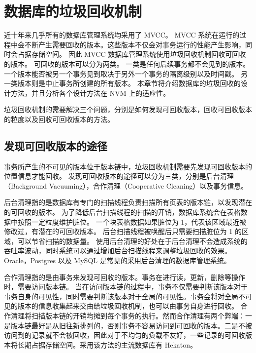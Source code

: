 \section{数据库的垃圾回收机制}

近十年来几乎所有的数据库管理系统均采用了 MVCC。
MVCC 系统在运行的过程中会不断产生需要回收的版本。这些版本不仅会对事务运行的性能产生影响，同时会占据存储空间。
因此 MVCC 数据库管理系统使用垃圾回收机制回收可回收的版本。
可回收的版本可以分为两类。
一类是任何后续事务都不会见到的版本。一个版本能否被另一个事务见到取决于另外一个事务的隔离级别以及时间戳。
另一类版本则是中止事务所创建的所有版本。
本章节将介绍数据库的垃圾回收的设计方法，并且分析各个设计方法在 NVM 上的适应性。

垃圾回收机制的需要解决三个问题，分别是如何发现可回收版本，回收可回收版本的粒度以及回收可回收版本的方法。

\subsection{发现可回收版本的途径}

事务所产生的不可见的版本位于版本链中，垃圾回收机制需要先发现可回收版本的位置信息才能回收。
发现可回收版本的途径可以分为三类，分别是后台清理（Background Vacuuming），合作清理（Cooperative Cleaning）以及事务信息。

后台清理指的是数据库有专门的扫描线程负责扫描所有页表的版本链，以发现潜在的可回收的版本。
为了降低后台扫描线程的扫描的开销，数据库系统会在表格数据中按照一定粒度维护脏位。
一个块表格数据如果脏位为 1，代表该区域最近被修改过，有潜在的可回收版本。
后台扫描线程被唤醒后只需要扫描脏位为 1 的区域，可以节省扫描的数据量。
使用后台清理的好处在于后台清理不会造成系统的吞吐率波动，同时系统可以通过增加后台扫描线程来调整垃圾回收的效果。Oracle\cite{oracle}，Postgres\cite{pg} 以及 MySQL\cite{mysql} 是常见的采用后台清理的数据库管理系统。

合作清理指的是由事务来发现可回收的版本。事务在进行读，更新，删除等操作时，需要访问版本链。
当在访问版本链的过程中，事务不仅需要判断该版本对于事务自身的可见性，同时需要判断该版本对于全局的可见性。事务会将对全局不可见的版本的信息收集起来交由给垃圾回收机制，也可以由事务自身进行回收。
合作清理将扫描版本链的开销均摊到每个事务的执行。然而合作清理有两个弊端：一是版本链最好是从旧往新排列的，否则事务不容易访问到可回收的版本。二是不被访问到的记录就不会被回收，因此对于不均匀的负载不友好，一些记录的可回收版本将长期占据存储空间。采用该方法的主流数据库有 Hekaton\cite{hekaton}。

